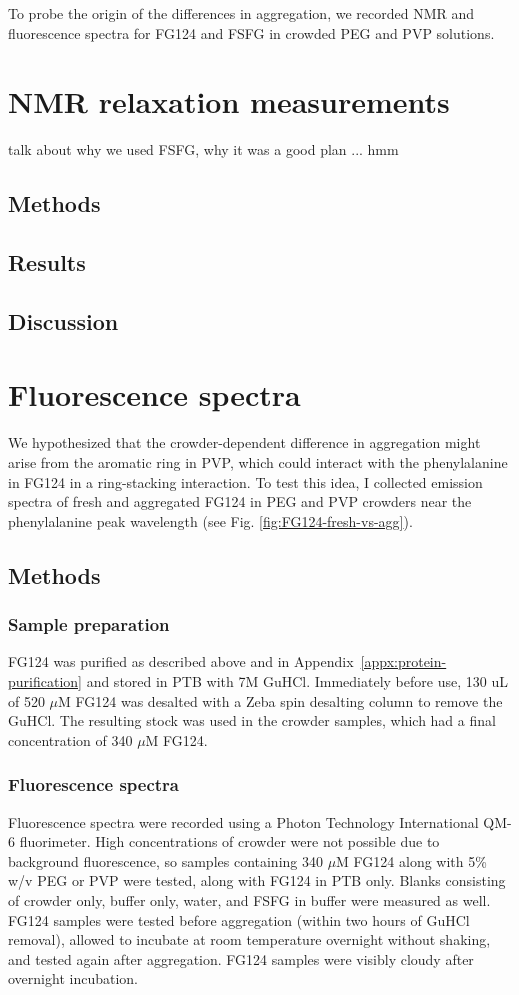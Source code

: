 To probe the origin of the differences in aggregation, we recorded NMR and fluorescence spectra for FG124 and FSFG in crowded PEG and PVP solutions.

\section{NMR relaxation measurements}
talk about why we used FSFG, why it was a good plan ... hmm
\subsection{Methods}
\subsection{Results}
\subsection{Discussion}

\section{Fluorescence spectra}
We hypothesized that the crowder-dependent difference in aggregation might arise from the aromatic ring in PVP, which could interact with the phenylalanine in FG124 in a ring-stacking interaction.  To test this idea, I collected emission spectra of fresh and aggregated FG124 in PEG and PVP crowders near the phenylalanine peak wavelength (see Fig. \ref{fig:FG124-fresh-vs-agg}). 
\subsection{Methods}

\subsubsection{Sample preparation}
FG124 was purified as described above and in Appendix~\ref{appx:protein-purification} and stored in PTB with 7M GuHCl.  Immediately before use, 130 uL of 520 $\mu$M FG124 was desalted with a Zeba spin desalting column to remove the GuHCl.  The resulting stock was used in the crowder samples, which had a final concentration of 340 $\mu$M FG124. 

\subsubsection{Fluorescence spectra}
Fluorescence spectra were recorded using a Photon Technology International QM-6 fluorimeter.  High concentrations of crowder were not possible due to background fluorescence, so samples containing 340 $\mu$M FG124 along with 5\% w/v PEG or PVP were tested, along with FG124 in PTB only.  Blanks consisting of crowder only, buffer only, water, and FSFG in buffer were measured as well.  FG124 samples were tested before aggregation (within two hours of GuHCl removal), allowed to incubate at room temperature overnight without shaking, and tested again after aggregation.  FG124 samples were visibly cloudy after overnight incubation.

